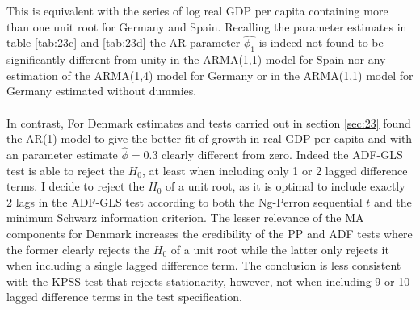 This is equivalent with the series of log real GDP per capita containing more than one unit root for Germany and Spain. Recalling the parameter estimates in table \ref{tab:23c} and \ref{tab:23d} the AR parameter $\hat{\phi_1}$ is indeed not found to be significantly different from unity in the ARMA(1,1) model for Spain nor any estimation of the ARMA(1,4) model for Germany or in the ARMA(1,1) model for Germany estimated without dummies.
\\
\\
In contrast, For Denmark estimates and tests carried out in section \ref{sec:23} found the AR(1) model to give the better fit of growth in real GDP per capita and with an parameter estimate $\hat{\phi}=0.3$ clearly different from zero. Indeed the ADF-GLS test is able to reject the $H_0$, at least when including only 1 or 2 lagged difference terms. I decide to reject the $H_0$ of a unit root, as it is optimal to include exactly 2 lags in the ADF-GLS test according to both the Ng-Perron sequential $t$ and the minimum Schwarz information criterion. The lesser relevance of the MA components for Denmark increases the credibility of the PP and ADF tests where the former clearly rejects the $H_0$ of a unit root while the latter only rejects it when including a single lagged difference term. The conclusion is less consistent with the KPSS test that rejects stationarity, however, not when including 9 or 10 lagged difference terms in the test specification.

